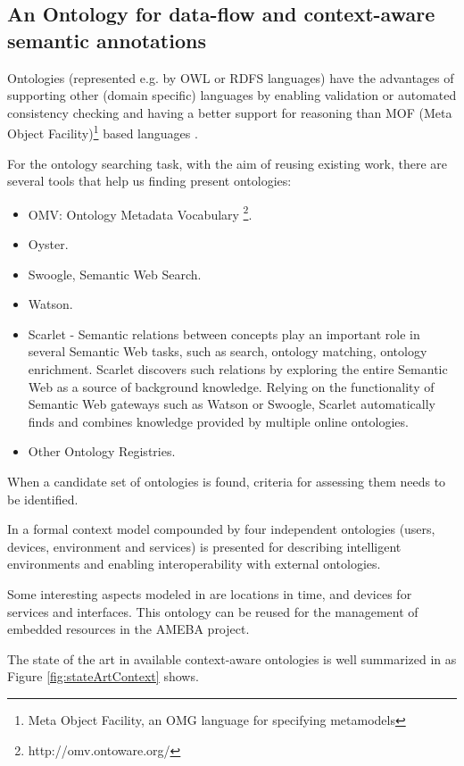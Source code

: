 \documentclass[[10pt,abbrv]{llncs}
\begin{document}
\subsection{An Ontology for data-flow and context-aware semantic annotations}
Ontologies (represented e.g. by OWL or RDFS languages) have the advantages of supporting other (domain specific) languages by enabling validation or automated consistency checking and having a better support for reasoning than MOF (Meta Object Facility)\footnote{Meta Object Facility, an OMG language for specifying metamodels} based languages \cite{Happel06}.

For the ontology searching task, with the aim of reusing existing work, there are several tools that help us finding present ontologies:
\begin{itemize}
\item OMV: Ontology Metadata Vocabulary \footnote{http://omv.ontoware.org/}.
\item Oyster.
\item Swoogle, Semantic Web Search.
\item Watson.
\item Scarlet - Semantic relations between concepts play an important role in several Semantic Web tasks, such as search, ontology matching, ontology enrichment. Scarlet discovers such relations by exploring the entire Semantic Web as a source of background knowledge. Relying on the functionality of Semantic Web gateways such as Watson or Swoogle, Scarlet automatically finds and combines knowledge provided by multiple online ontologies.
\item Other Ontology Registries.
\end{itemize}

When a candidate  set of ontologies is found, criteria for assessing them needs to be identified.	

In \cite {Hervas10} a formal context model compounded by four independent ontologies (users, devices, environment and services) is presented for describing intelligent environments and enabling interoperability with external ontologies.


Some interesting aspects modeled in \cite{Hervas10} are locations in time, and devices for services and interfaces. This ontology can be reused for the management of embedded resources in the AMEBA project. %

The state of the art in available context-aware ontologies is well summarized in \cite{Poveda10} as Figure \ref{fig:stateArtContext} shows.
\end{document}
